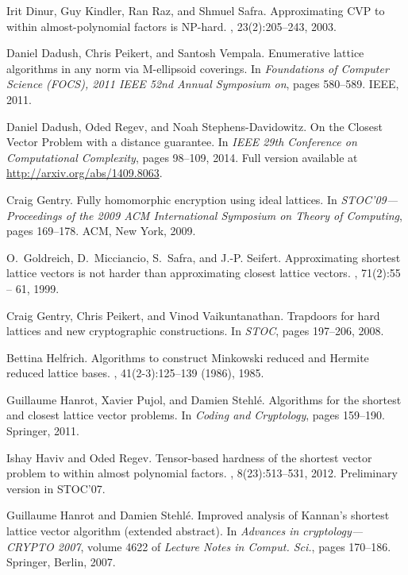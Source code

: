 \documentclass[11pt]{article}
\begin{document}
\begin{thebibliography}{DKRS03}
Irit Dinur, Guy Kindler, Ran Raz, and Shmuel Safra.
\newblock Approximating {CVP} to within almost-polynomial factors is {NP}-hard.
, 23(2):205--243, 2003.

Daniel Dadush, Chris Peikert, and Santosh Vempala.
\newblock Enumerative lattice algorithms in any norm via {M}-ellipsoid
  coverings.
\newblock In {\em Foundations of Computer Science (FOCS), 2011 IEEE 52nd Annual
  Symposium on}, pages 580--589. IEEE, 2011.

Daniel Dadush, Oded Regev, and Noah Stephens{-}Davidowitz.
\newblock On the {C}losest {V}ector {P}roblem with a distance guarantee.
\newblock In {\em {IEEE} 29th Conference on Computational Complexity}, pages
  98--109, 2014.
\newblock Full version available at \url{http://arxiv.org/abs/1409.8063}.

Craig Gentry.
\newblock Fully homomorphic encryption using ideal lattices.
\newblock In {\em S{TOC}'09---{P}roceedings of the 2009 {ACM} {I}nternational
  {S}ymposium on {T}heory of {C}omputing}, pages 169--178. ACM, New York, 2009.

O.~Goldreich, D.~Micciancio, S.~Safra, and J.-P. Seifert.
\newblock Approximating shortest lattice vectors is not harder than
  approximating closest lattice vectors.
, 71(2):55 -- 61, 1999.

Craig Gentry, Chris Peikert, and Vinod Vaikuntanathan.
\newblock Trapdoors for hard lattices and new cryptographic constructions.
\newblock In {\em STOC}, pages 197--206, 2008.

Bettina Helfrich.
\newblock Algorithms to construct {M}inkowski reduced and {H}ermite reduced
  lattice bases.
, 41(2-3):125--139 (1986), 1985.

Guillaume Hanrot, Xavier Pujol, and Damien Stehl{\'e}.
\newblock Algorithms for the shortest and closest lattice vector problems.
\newblock In {\em Coding and Cryptology}, pages 159--190. Springer, 2011.

Ishay Haviv and Oded Regev.
\newblock Tensor-based hardness of the shortest vector problem to within almost
  polynomial factors.
, 8(23):513--531, 2012.
\newblock Preliminary version in STOC'07.

Guillaume Hanrot and Damien Stehl{\'e}.
\newblock Improved analysis of {K}annan's shortest lattice vector algorithm
  (extended abstract).
\newblock In {\em Advances in cryptology---{CRYPTO} 2007}, volume 4622 of {\em
  Lecture Notes in Comput. Sci.}, pages 170--186. Springer, Berlin, 2007.


\end{thebibliography}
\end{document}
